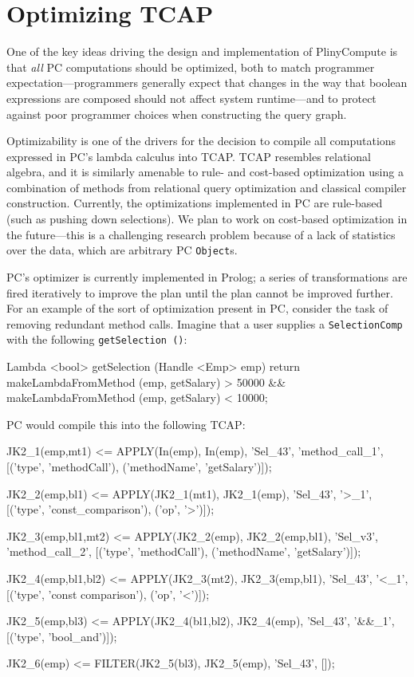 
\section{Optimizing TCAP}
\label{sec:optimizer}

One of the key ideas driving the design and implementation of PlinyCompute is that \emph{all} PC computations should be optimized, both to
match programmer expectation---programmers generally expect
that changes in the way that boolean expressions are composed should not affect system runtime---and 
to protect against poor programmer choices when constructing the query graph.

Optimizability is one of the drivers for
the decision to compile all computations expressed in PC's lambda calculus into TCAP.  
TCAP resembles relational algebra, and it is similarly amenable to rule- and cost-based optimization
using a combination of methods from relational query optimization and classical compiler construction.
Currently, the optimizations implemented in PC are rule-based (such as pushing down selections).  We plan to work on cost-based optimization
in the future---this is a challenging research problem because of a lack of statistics over the data, which are arbitrary PC \texttt{Object}s.

PC's optimizer is currently implemented
in Prolog; a series of transformations are fired iteratively to improve the plan until the plan cannot be improved further.
For an example of the sort of optimization present in PC, consider the task of removing redundant method calls.  Imagine that a user
supplies a \texttt{SelectionComp} with the following \texttt{getSelection ()}:

\begin{codesmall} 
Lambda <bool> getSelection (Handle 
     <Emp> emp) {
        return makeLambdaFromMethod
             (emp, getSalary) > 50000 &&
		makeLambdaFromMethod (emp, 
                   getSalary) < 10000;
}	
\end{codesmall}

\noindent PC would compile this into the following TCAP:

\begin{codesmall}
JK2_1(emp,mt1) <= APPLY(In(emp), In(emp), 
     'Sel_43', 'method_call_1',
  [('type', 'methodCall'), ('methodName', 'getSalary')]);

JK2_2(emp,bl1) <= APPLY(JK2_1(mt1), 
     JK2_1(emp), 'Sel_43', '>_1', 
  [('type', 'const_comparison'), ('op', '>')]);

JK2_3(emp,bl1,mt2) <= APPLY(JK2_2(emp), 
    JK2_2(emp,bl1), 'Sel_v3', 'method_call_2',
  [('type', 'methodCall'), ('methodName', 'getSalary')]);

JK2_4(emp,bl1,bl2) <= APPLY(JK2_3(mt2), 
    JK2_3(emp,bl1), 'Sel_43', '<_1',
  [('type', 'const comparison'), ('op', '<')]);

JK2_5(emp,bl3) <= APPLY(JK2_4(bl1,bl2), 
    JK2_4(emp), 'Sel_43', '&&_1', 
  [('type', 'bool_and')]);

JK2_6(emp) <= FILTER(JK2_5(bl3), 
   JK2_5(emp), 'Sel_43', []);
\end{codesmall}

